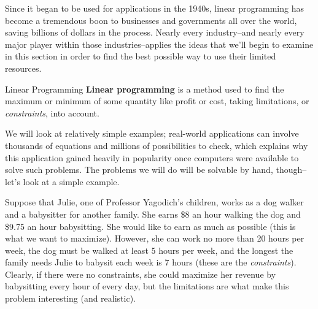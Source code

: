 \setcounter{ExampleCounter}{1}
Since it began to be used for applications in the 1940s, linear programming has become a tremendous boon to businesses and governments all over the world, saving billions of dollars in the process.  Nearly every industry--and nearly every major player within those industries--applies the ideas that we'll begin to examine in this section in order to find the best possible way to use their limited resources.

\begin{proc}{Linear Programming}
\textbf{Linear programming} is a method used to find the maximum or minimum of some quantity like profit or cost, taking limitations, or \emph{constraints}, into account.
\end{proc}

We will look at relatively simple examples; real-world applications can involve thousands of equations and millions of possibilities to check, which explains why this application gained heavily in popularity once computers were available to solve such problems.  The problems we will do will be solvable by hand, though--let's look at a simple example.\\

\begin{tcolorbox}[sharp corners=all]
 Suppose that Julie, one of Professor Yagodich's children, works as a dog walker and a babysitter for another family.  She earns \$8 an hour walking the dog and \$9.75 an hour babysitting.  She would like to earn as much as possible (this is what we want to maximize).  However, she can work no more than 20 hours per week, the dog must be walked at least 5 hours per week, and the longest the family needs Julie to babysit each week is 7 hours (these are the \emph{constraints}).  Clearly, if there were no constraints, she could maximize her revenue by babysitting every hour of every day, but the limitations are what make this problem interesting (and realistic).
\end{tcolorbox}

